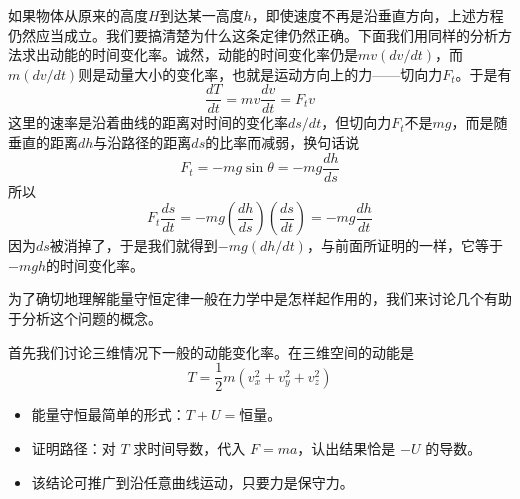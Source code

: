 如果物体从原来的高度$H$到达某一高度$h$，即使速度不再是沿垂直方向，上述方程仍然应当成立。我们要搞清楚为什么这条定律仍然正确。下面我们用同样的分析方法求出动能的时间变化率。诚然，动能的时间变化率仍是$mv(dv/dt)$，而$m(dv/dt)$则是动量大小的变化率，也就是运动方向上的力——切向力$F_t$。于是有
\begin{equation*}
    \frac{dT}{dt}=mv\frac{dv}{dt}=F_tv
\end{equation*}
这里的速率是沿着曲线的距离对时间的变化率$ds/dt$，但切向力$F_t$不是$mg$，而是随垂直的距离$dh$与沿路径的距离$ds$的比率而减弱，换句话说
\begin{equation*}
    F_t=-mg\sin \theta=-mg\frac{dh}{ds}
\end{equation*}
所以
\begin{equation*}
    F_t\frac{ds}{dt}=-mg(\frac{dh}{ds})(\frac{ds}{dt})=-mg\frac{dh}{dt}
\end{equation*}
因为$ds$被消掉了，于是我们就得到$-mg(dh/dt)$，与前面所证明的一样，它等于$-mgh$的时间变化率。

为了确切地理解能量守恒定律一般在力学中是怎样起作用的，我们来讨论几个有助于分析这个问题的概念。

首先我们讨论三维情况下一般的动能变化率。在三维空间的动能是
\begin{equation*}
    T=\frac{1}{2}m(v_x^2+v_y^2+v_z^2)
\end{equation*}

\begin{summarybox}[本节要点]
  \begin{itemize}
    \item 能量守恒最简单的形式：$T+U=\text{恒量}$。
    \item 证明路径：对 $T$ 求时间导数，代入 $F=ma$，认出结果恰是 $-U$ 的导数。
    \item 该结论可推广到沿任意曲线运动，只要力是保守力。
  \end{itemize}
\end{summarybox}
